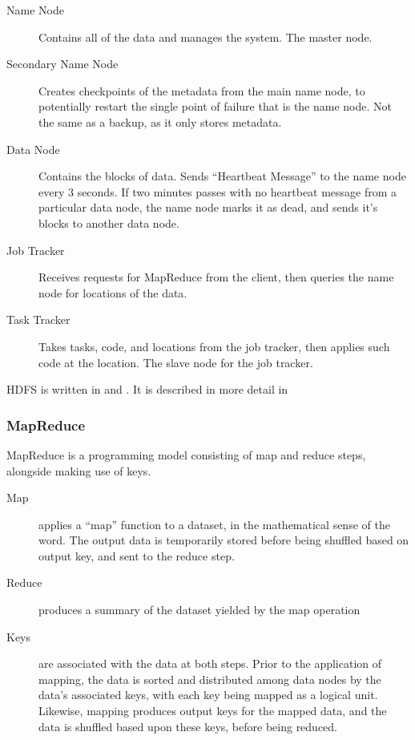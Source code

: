 \begin{description}

    \item[Name Node]
        Contains all of the data and manages the system. The master node.
    \item[Secondary Name Node]
        Creates checkpoints of the metadata from the main name node, to
        potentially restart the single point of failure that is the name node.
        Not the same as a backup, as it only stores metadata.
    \item[Data Node]
        Contains the blocks of data. Sends ``Heartbeat Message'' to the name
        node every 3 seconds. If two minutes passes with no heartbeat message
        from a particular data node, the name node marks it as dead, and sends
        it's blocks to another data node.
    \item[Job Tracker]
        Receives requests for MapReduce from the client, then queries the name
        node for locations of the data.
    \item[Task Tracker]
        Takes tasks, code, and locations from the job tracker, then applies such
        code at the location. The slave node for the job tracker.
\end{description}

HDFS is written in  and . It is described in more detail in \cite{shvachko2010hadoop}

\subsubsection{MapReduce}\label{sec:mapreduce}

MapReduce is a programming model consisting of map and reduce steps,
alongside making use of keys.

\begin{description}

    \item[Map]
        applies a ``map'' function to a dataset, in the mathematical sense of
        the word. The output data is temporarily stored before being shuffled
        based on output key, and sent to the reduce step.
    \item[Reduce]
        produces a summary of the dataset yielded by the map operation
    \item[Keys]
        are associated with the data at both steps. Prior to the application of
        mapping, the data is sorted and distributed among data nodes by the
        data's associated keys, with each key being mapped as a logical unit.
        Likewise, mapping produces output keys for the mapped data, and the data
        is shuffled based upon these keys, before being reduced.
\end{description}

